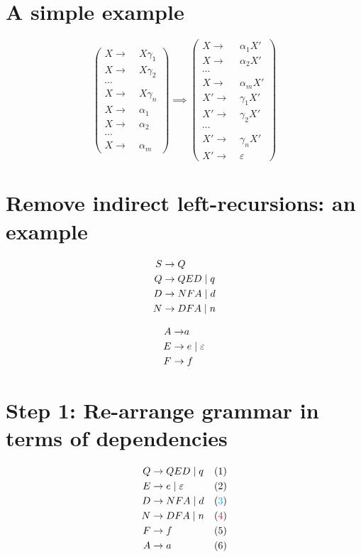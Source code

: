 \documentclass[10pt,a4paper,landscape]{article}
\begin{document}
\begin{multicols*}{3}
\section*{A simple example}
\[
\begin{pmatrix}
  X\to&\; X \gamma_1 \\
  X\to&\; X \gamma_2 \\
  \cdots             \\
  X\to&\; X \gamma_n \\
  X\to&\; \alpha_1   \\
  X\to&\; \alpha_2   \\
  \cdots             \\
  X\to&\; \alpha_m
\end{pmatrix}
\implies
\begin{pmatrix}
  X\to&\; \alpha_1 X' \\
  X\to&\; \alpha_2 X' \\
  \cdots             \\
  X\to&\; \alpha_m X' \\
  X'\to&\;\gamma_1 X' \\
  X'\to&\; \gamma_2 X' \\
  \cdots             \\
  X'\to&\; \gamma_n X' \\
  X'\to&\; \varepsilon
\end{pmatrix}
\]
\section*{Remove indirect left-recursions: an example}
\begin{minipage}{.5\linewidth}
\begin{align}
  S\to &\; Q \\
  Q\to &\; QED \;|\; q \\
  D\to &\; NFA \;|\; d \\
  N\to &\; DFA \;|\; n
\end{align}
\end{minipage}
\begin{minipage}{.5\linewidth}
\begin{align}
  A\to & a \\
  E\to &\; e \;|\; \varepsilon \\
  F\to &\; f
\end{align}
\end{minipage}
\section*{Step 1: Re-arrange grammar in terms of dependencies}
\begin{align*}
  Q\to &\; QED \gor q & (1)\\
  E\to &\; e \gor \varepsilon &(2) \\
  D\to &\; NFA \gor d & (\mb{3})\\
  N\to &\; DFA \gor n & (\mo{4})\\
  F\to &\; f          & (5)\\
  A\to &\; a            & (6)
\end{align*}

\end{multicols*}
\end{document}

